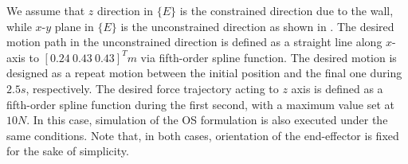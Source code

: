 We assume that $z$ direction in $\{E\}$ is the constrained direction due to the wall,
while $x$-$y$ plane in $\{E\}$ is the unconstrained direction as shown in .
The desired motion path in the unconstrained direction is defined as a straight line along $x$-axis
to $[0.24~0.43~0.43]^{T}\unit{m}$ via fifth-order spline function.
The desired motion is designed as a repeat motion between the initial position and the final one
during $2.5\unit{s}$, respectively.
The desired force trajectory acting to $z$ axis is defined as a fifth-order spline function during the first second,
with a maximum value set at $10\unit{N}$.
In this case, simulation of the OS formulation is also executed under the same conditions.
Note that, in both cases, orientation of the end-effector is fixed for the sake of simplicity.


